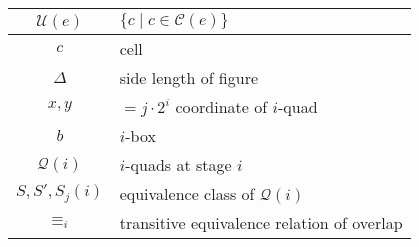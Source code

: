 \begin{figure}
\begin{center}
\begin{tabular}{| c | l |}
	\hline
	$\mathcal{U}(e)$ & $\{c \mid c \in \mathcal{C}(e)\}$ \\
	\hline
	$c$ & cell \\
	\hline
	$\Delta$ & side length of figure \\
	\hline
	$x,y$ & $= j \cdot 2^i$ coordinate of $i$-quad \\
	\hline
	$b$ & $i$-box \\
	\hline
	$\mathcal{Q}(i)$ & $i$-quads at stage $i$ \\
	\hline
	$S, S', S_j(i)$ & equivalence class of $\mathcal{Q}(i)$ \\
	\hline
	$\equiv_i$ & transitive equivalence relation of overlap \\
	\hline
\end{tabular}
\end{center}
\end{figure}


